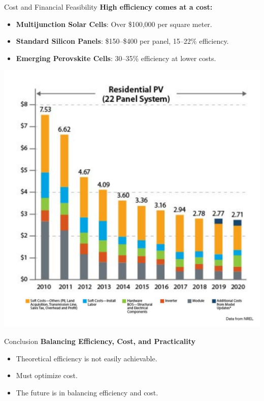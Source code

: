 \documentclass[aspectratio=169]{beamer} %
\begin{document}
\begin{frame}{Cost and Financial Feasibility}
    \textbf{High efficiency comes at a cost:}
    \begin{itemize}
        \item \textbf{Multijunction Solar Cells}: Over \$100,000 per square meter.
        \item \textbf{Standard Silicon Panels}: \$150--\$400 per panel, 15--22\% efficiency.
        \item \textbf{Emerging Perovskite Cells}: 30--35\% efficiency at lower costs.
    \end{itemize}
    \centering
    \includegraphics[width=0.6\linewidth]{solar_costs.png} %
\end{frame}

\begin{frame}{Conclusion}
    \textbf{Balancing Efficiency, Cost, and Practicality}
    \begin{itemize}
        \item Theoretical efficiency is not easily achievable.
        \item Must optimize cost.
        \item The future is in balancing efficiency and cost.
    \end{itemize}
\end{frame}
\end{document}
